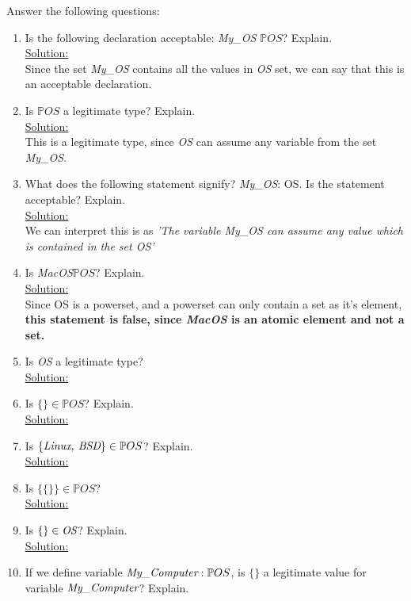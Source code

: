 \noindent Answer the following questions:\
\begin{enumerate}
  \item Is the following declaration acceptable: \emph{My\_OS $\mathbb{P}OS$}? Explain.\\
  \noindent\underline{Solution:}\\ Since the set \emph{My\_OS} contains all the values in \emph{OS} set, we can say that this is an acceptable declaration.
  \item Is $\mathbb{P}OS$ a legitimate type? Explain.\\
  \noindent\underline{Solution:}\\ This is a legitimate type, since \emph{OS} can assume any variable from the set \emph{My\_OS}.
  \item What does the following statement signify? \emph{My\_OS}: OS. Is the statement acceptable? Explain.\\
  \noindent\underline{Solution:}\\ We can interpret this is as \emph{'The variable My\_OS can assume any value which is contained in the set OS' }
  \item Is \emph{MacOS}$\mathbb{P}OS$? Explain.\\
  \noindent\underline{Solution:}\\ Since OS is a powerset, and a powerset can only contain a set as it's element, \textbf{this statement is false, since \emph{MacOS} is an atomic element and not a set.}
  \item Is \emph{OS} a legitimate type?\\
  \noindent\underline{Solution:}\\
  \item Is $\{ \} \in \mathbb{P}OS$? Explain.\\
  \noindent\underline{Solution:}\\
  \item Is $\{\emph{Linux, BSD} \} \in \mathbb{P}OS$? Explain.\\
  \noindent\underline{Solution:}\\
  \item Is $\{ \{ \} \} \in \mathbb{P}OS$?\\
  \noindent\underline{Solution:}\\
  \item Is $\{ \} \in \emph{OS}$? Explain.\\
  \noindent\underline{Solution:}\\
  \item If we define variable $\emph{My\_Computer} : \mathbb{P}OS$, is $\{ \}$ a legitimate value for variable  $\emph{My\_Computer}$? Explain.\\

\end{enumerate}
